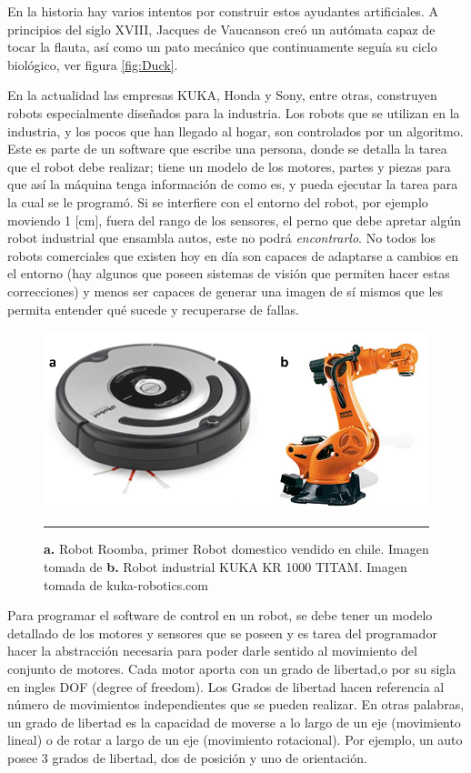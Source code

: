 En la historia hay varios intentos por construir estos ayudantes artificiales. A principios del siglo XVIII, Jacques de Vaucanson creó un autómata capaz de tocar la flauta, así como un pato mecánico que continuamente seguía su ciclo biológico, ver figura \ref{fig:Duck}.

En la actualidad las empresas KUKA, Honda y Sony, entre otras, construyen robots especialmente diseñados para la industria. Los robots que se utilizan en la industria, y los pocos que han llegado al hogar, son controlados por un algoritmo. Este es parte de un software que escribe una persona, donde se detalla la tarea que el robot debe realizar; tiene un modelo de los motores, partes y piezas para que así la máquina tenga información de como es, y pueda ejecutar la tarea para la cual se le programó. Si se interfiere con el entorno del robot, por ejemplo moviendo 1 [cm], fuera del rango de los sensores, el perno que debe apretar algún robot industrial que ensambla autos, este no podrá \textit{encontrarlo}. No todos los robots comerciales que existen hoy en día son capaces de adaptarse a cambios en el entorno (hay algunos que poseen sistemas de visión que permiten hacer estas correcciones) y menos ser capaces de generar una imagen de sí mismos que les permita entender qué sucede y recuperarse de fallas.

\begin{figure}[htbp]
	\centering
		\includegraphics[width=\textwidth]{./Figures/RobotsInd.png}
		\rule{35em}{0.5pt}
	\caption[Robots Roomba y KUKA]{\textbf{a. }Robot Roomba, primer Robot domestico vendido en chile. Imagen tomada de \cite{Forlizzi:2006:SRD:1121241.1121286} \textbf{b.} Robot industrial KUKA KR 1000 TITAM. Imagen tomada de kuka-robotics.com}
	\label{fig:Roomba y KUKA}
\end{figure}

Para programar el software de control en un robot, se debe tener un modelo detallado de los motores y sensores que se poseen y es tarea del programador hacer la abstracción necesaria para poder darle sentido al movimiento del conjunto de motores. Cada motor aporta con un grado de libertad,o por su sigla en ingles DOF (degree of freedom). Los Grados de libertad hacen referencia al número de movimientos independientes que se pueden realizar. En otras palabras, un grado de libertad es la capacidad de moverse a lo largo de un eje (movimiento lineal) o de rotar a largo de un eje (movimiento rotacional). Por ejemplo, un auto posee 3 grados de libertad, dos de posición y uno de orientación. 

